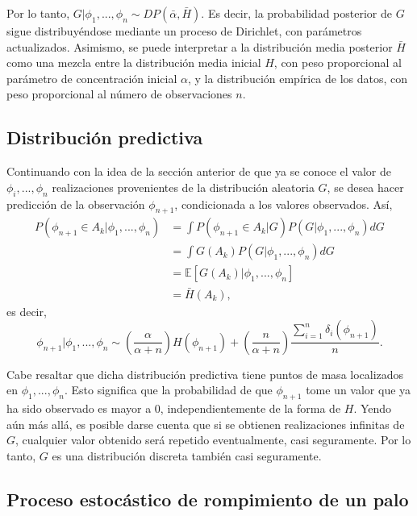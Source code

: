 Por lo tanto, $G|\phi_1,...,\phi_n \sim DP(\bar{\alpha},\bar{H})$. Es decir, la probabilidad posterior de $G$ sigue distribuy\'endose mediante un proceso de Dirichlet, con par\'ametros actualizados. Asimismo, se puede interpretar a la distribuci\'on media posterior $\bar{H}$ como una mezcla entre la distribuci\'on media inicial $H$, con peso proporcional al par\'ametro de concentraci\'on inicial $\alpha$, y la distribuci\'on emp\'irica de los datos, con peso proporcional al n\'umero de observaciones $n$. 

\subsection{Distribuci\'on predictiva}

Continuando con la idea de la secci\'on anterior de que ya se conoce el valor de $\phi_i,...,\phi_n$ realizaciones provenientes de la distribuci\'on aleatoria $G$, se desea hacer predicci\'on de la observaci\'on $\phi_{n+1}$, condicionada a los valores observados. As\'i,
\begin{equation*}
\begin{aligned}
   P(\phi_{n+1} \in A_k|\phi_1,...,\phi_n)
   &= \int P(\phi_{n+1} \in A_k|G) P(G|\phi_1,...,\phi_n) dG \\ 
   &= \int G(A_k) P(G|\phi_1,...,\phi_n) dG \\ 
   &= \mathbb{E}[G(A_k)|\phi_1,...,\phi_n] \\
   &= \bar{H}(A_k),
\end{aligned}    
\end{equation*}
es decir, 
\begin{equation*}
    \phi_{n+1}|\phi_1,...,\phi_n \sim 
    \left(\frac{\alpha}{\alpha + n}\right)H(\phi_{n+1}) + 
    \left(\frac{n}{\alpha + n}\right)\frac{\sum_{i=1}^n \delta_i(\phi_{n+1})}{n}.
\end{equation*}

Cabe resaltar que dicha distribuci\'on predictiva tiene puntos de masa localizados en $\phi_1,...,\phi_n$. Esto significa que la probabilidad de que $\phi_{n+1}$ tome un valor que ya ha sido observado es mayor a $0$, independientemente de la forma de $H$. Yendo a\'un m\'as all\'a, es posible darse cuenta que si se obtienen realizaciones infinitas de $G$, cualquier valor obtenido ser\'a repetido eventualmente, casi seguramente. Por lo tanto, $G$ es una distribuci\'on discreta tambi\'en casi seguramente.

\subsection{Proceso estoc\'astico de rompimiento de un palo}

